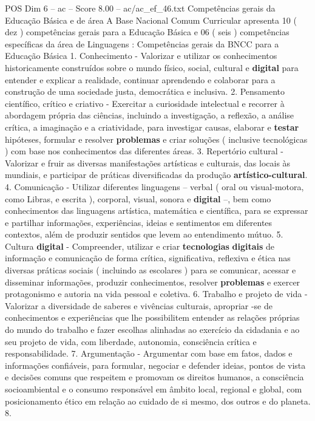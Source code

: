 \begin{textsample}{POS Dim 6 – ac – Score 8.00 – ac/ac\_ef\_46.txt}
Competências gerais da Educação Básica e de área A Base Nacional Comum Curricular apresenta 10 ( dez ) competências gerais para a Educação Básica e 06 ( seis ) competências específicas da área de Linguagens : Competências gerais da BNCC para a Educação Básica 1.
Conhecimento - Valorizar e utilizar os conhecimentos historicamente construídos sobre o mundo físico, social, cultural e \textbf{digital} para entender e explicar a realidade, continuar aprendendo e colaborar para a construção de uma sociedade justa, democrática e inclusiva. 2.
Pensamento científico, crítico e criativo - Exercitar a curiosidade intelectual e recorrer à abordagem própria das ciências, incluindo a investigação, a reflexão, a análise crítica, a imaginação e a criatividade, para investigar causas, elaborar e \textbf{testar} hipóteses, formular e resolver \textbf{problemas} e criar soluções ( inclusive tecnológicas ) com base nos conhecimentos das diferentes áreas. 3.
Repertório cultural - Valorizar e fruir as diversas manifestações artísticas e culturais, das locais às mundiais, e participar de práticas diversificadas da produção \textbf{artístico-cultural}. 4.
Comunicação - Utilizar diferentes linguagens – verbal ( oral ou visual-motora, como Libras, e escrita ), corporal, visual, sonora e \textbf{digital} –, bem como conhecimentos das linguagens artística, matemática e científica, para se expressar e partilhar informações, experiências, ideias e sentimentos em diferentes contextos, além de produzir sentidos que levem ao entendimento mútuo. 5.
Cultura \textbf{digital} - Compreender, utilizar e criar \textbf{tecnologias} \textbf{digitais} de informação e comunicação de forma crítica, significativa, reflexiva e ética nas diversas práticas sociais ( incluindo as escolares ) para se comunicar, acessar e disseminar informações, produzir conhecimentos, resolver \textbf{problemas} e exercer protagonismo e autoria na vida pessoal e coletiva. 6.
Trabalho e projeto de vida - Valorizar a diversidade de saberes e vivências culturais, apropriar -se de conhecimentos e experiências que lhe possibilitem entender as relações próprias do mundo do trabalho e fazer escolhas alinhadas ao exercício da cidadania e ao seu projeto de vida, com liberdade, autonomia, consciência crítica e responsabilidade. 7.
Argumentação - Argumentar com base em fatos, dados e informações confiáveis, para formular, negociar e defender ideias, pontos de vista e decisões comuns que respeitem e promovam os direitos humanos, a consciência socioambiental e o consumo responsável em âmbito local, regional e global, com posicionamento ético em relação ao cuidado de si mesmo, dos outros e do planeta. 8.

\end{textsample}
